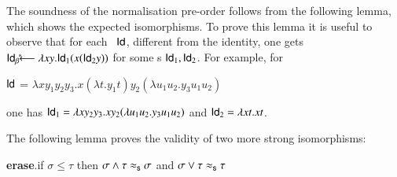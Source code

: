 \documentclass[UKenglish]{eptcs}
\newcommand{\tA}{\sigma}       \newcommand{\tB}{\tau}
\newcommand{\tS}{\sigma}       \newcommand{\tT}{\tau}
\newcommand{\id}{{\sf Id}}
\newcommand{\mtob}{\;^*\!\!\!\!{_\beta}\!\!\longleftarrow}
\newcommand{\isos}{\approx_{\sf s}}
\newcommand{\myformula}[1]{\\[0.5pt]\centerline{#1}}
\begin{document}
\smallskip


The soundness of the normalisation pre-order follows from the following lemma, which shows the expected isomorphisms. To prove this lemma it is useful to observe that  for
each \fhi\  $\id$,  different from the identity, one gets $\id\mtob\lambda xy. \id_1(x(\id_2y))$ for some \fhi s $\id_1,\id_2$.
For example,  for  \myformula{$\id$ = $\lambda x y_1 y_2 y_3.x(\lambda t.y_1t) y_2 (\lambda u_1 u_2.y_3 u_1 u_2)$} one has $\id_1 = \lambda x y_2 y_3.x y_2 (\lambda u_1 u_2.y_3 u_1 u_2)$ and $\id_2 = \lambda x t.x t$.

\medskip

 The following lemma proves the validity of two more strong isomorphisms:
\myformula{ \mbox{\rm{\bfseries erase}.}\qquad  if $\tA\leq\tB$ \qquad then \qquad
$\tS \wedge  \tT\isos\tS$ \qquad and \qquad $\tS \vee  \tT\isos\tT$}
\end{document}
